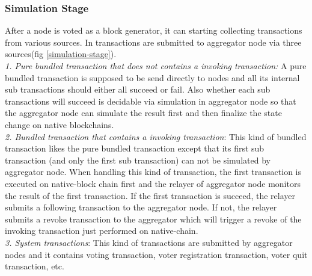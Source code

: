 \documentclass[pageno]{jpaper}
\begin{document}
\subsubsection{Simulation Stage}
After a node is voted as a block generator, it can starting collecting transactions from various sources. In \dprotocol transactions are submitted to aggregator node via three sources(fig \ref{simulation-stage}).\\
\newline
\textit{1. Pure bundled transaction that does not contains a invoking transaction:} A pure bundled transaction is supposed to be send directly to \dprotocol nodes and all its internal sub transactions should either all succeed or fail. Also whether each sub transactions will succeed is decidable via simulation in aggregator node so that the aggregator node can simulate the result first and then finalize the state change on native blockchains.\\
\newline
\textit{2. Bundled transaction that contains a invoking transaction}: This kind of bundled transaction likes the pure bundled transaction except that its first sub transaction (and only the first sub transaction) can not be simulated by aggregator node. When handling this kind of transaction, the first transaction is executed on native-block chain first and the relayer of aggregator node monitors the result of the first transaction. If the first transaction is succeed, the relayer submits a following transaction to the aggregator node. If not, the relayer submits a revoke transaction to the aggregator which will trigger a revoke of the invoking transaction just performed on native-chain.\\
\newline
\textit{3. System transactions}: This kind of transactions are submitted by aggregator nodes and it contains voting transaction, voter registration transaction, voter quit transaction, etc.
\end{document}
